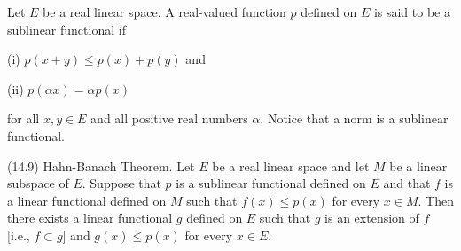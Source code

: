 Let $E$ be a real linear space. A real-valued function $p$ defined on $E$ is said to be a sublinear functional if

(i) $p(x + y) \leq p(x) + p(y)$ and

(ii) $p(\alpha x) = \alpha p(x)$

for all $x, y \in E$ and all positive real numbers $\alpha$. Notice that a norm is a sublinear functional.

(14.9) Hahn-Banach Theorem. Let $E$ be a real linear space and let $M$ be a linear subspace of $E$. Suppose that $p$ is a sublinear functional defined on $E$ and that $f$ is a linear functional defined on $M$ such that $f(x) \leq p(x)$ for every $x \in M$. Then there exists a linear functional $g$ defined on $E$ such that $g$ is an extension of $f$ [i.e., $f \subset g$] and $g(x) \leq p(x)$ for every $x \in E$.
